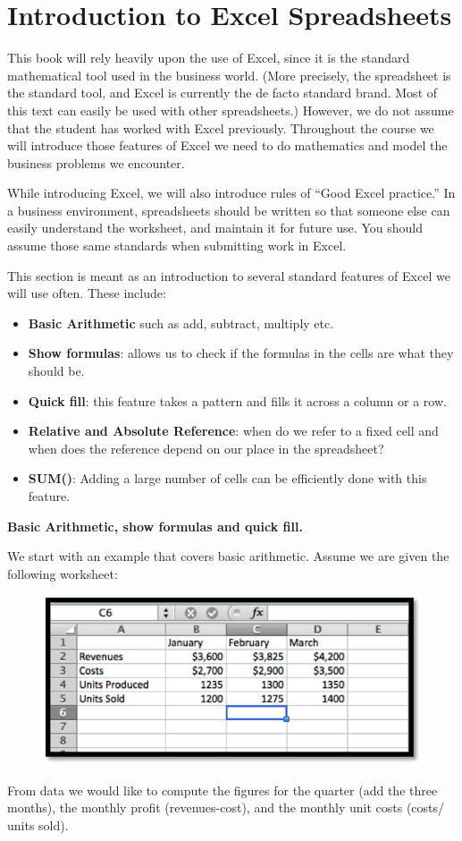\documentclass[10pt,]{book}
\newcommand{\terminology}[1]{\textbf{#1}}
\theoremstyle{plain}
\theoremstyle{definition}
\theoremstyle{definition}
\begin{document}
\section[{Introduction to Excel Spreadsheets}]{Introduction to Excel Spreadsheets}\label{sec-1-3-IntroExcelSpreadsheets}
This book will rely heavily upon the use of Excel, since it is the standard mathematical tool used in the business world.  (More precisely, the spreadsheet is the standard tool, and Excel is currently the de facto standard brand.  Most of this text can easily be used with other spreadsheets.) However, we do not assume that the student has worked with Excel previously. Throughout the course we will introduce those features of Excel we need to do mathematics and model the business problems we encounter.
%
\par

While introducing Excel, we will also introduce rules of “Good Excel practice.”  In a business environment, spreadsheets should be written so that someone else can easily understand the worksheet, and maintain it for future use. You should assume those same standards when submitting work in Excel.
%
\par
This section is meant as an introduction to several standard features of Excel we will use often. These include:
%
\leavevmode%
\begin{itemize}[label=\textbullet]
\item{}
\terminology{Basic Arithmetic} such as add, subtract, multiply etc.
%
\item{}
\terminology{Show formulas}: allows us to check if the formulas in the cells are what they should be.
%
\item{}
\terminology{Quick fill}: this feature takes a pattern and fills it across a column or a row.
%
\item{}
\terminology{Relative and Absolute Reference}: when do we refer to a fixed cell and when does the reference depend on our place in the spreadsheet? 
%
\item{}
\terminology{SUM()}: Adding a large number of cells can be efficiently done with this feature.
%
\end{itemize}
\par

\terminology{Basic Arithmetic, show formulas and quick fill.}%
\par
We start with an example that covers basic arithmetic.  Assume we are given the following worksheet:
%
\leavevmode%
\begin{figure}
\centering
\includegraphics[width=0.5\linewidth]{images/sec1-3-1BasicData.png}
\end{figure}
\par
From data we would like to compute the figures for the quarter (add the three months), the monthly profit (revenues-cost), and the monthly unit costs (costs/ units sold).%
\par
\end{document}
